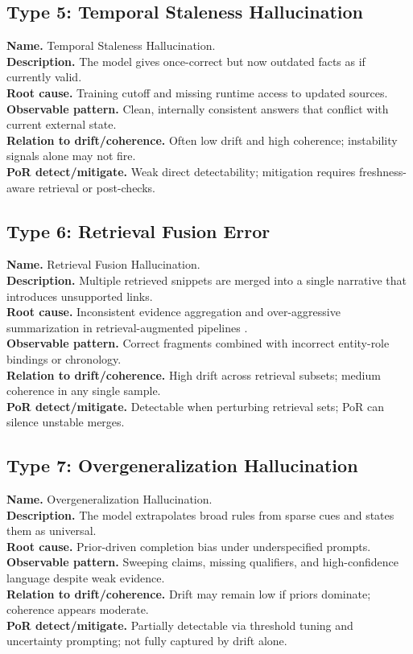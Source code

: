 \documentclass[11pt]{article}
\begin{document}
\subsection{Type 5: Temporal Staleness Hallucination}
\textbf{Name.} Temporal Staleness Hallucination.\\
\textbf{Description.} The model gives once-correct but now outdated facts as if currently valid.\\
\textbf{Root cause.} Training cutoff and missing runtime access to updated sources.\\
\textbf{Observable pattern.} Clean, internally consistent answers that conflict with current external state.\\
\textbf{Relation to drift/coherence.} Often low drift and high coherence; instability signals alone may not fire.\\
\textbf{PoR detect/mitigate.} Weak direct detectability; mitigation requires freshness-aware retrieval or post-checks.

\subsection{Type 6: Retrieval Fusion Error}
\textbf{Name.} Retrieval Fusion Hallucination.\\
\textbf{Description.} Multiple retrieved snippets are merged into a single narrative that introduces unsupported links.\\
\textbf{Root cause.} Inconsistent evidence aggregation and over-aggressive summarization in retrieval-augmented pipelines \cite{lewis2020rag}.\\
\textbf{Observable pattern.} Correct fragments combined with incorrect entity-role bindings or chronology.\\
\textbf{Relation to drift/coherence.} High drift across retrieval subsets; medium coherence in any single sample.\\
\textbf{PoR detect/mitigate.} Detectable when perturbing retrieval sets; PoR can silence unstable merges.

\subsection{Type 7: Overgeneralization Hallucination}
\textbf{Name.} Overgeneralization Hallucination.\\
\textbf{Description.} The model extrapolates broad rules from sparse cues and states them as universal.\\
\textbf{Root cause.} Prior-driven completion bias under underspecified prompts.\\
\textbf{Observable pattern.} Sweeping claims, missing qualifiers, and high-confidence language despite weak evidence.\\
\textbf{Relation to drift/coherence.} Drift may remain low if priors dominate; coherence appears moderate.\\
\textbf{PoR detect/mitigate.} Partially detectable via threshold tuning and uncertainty prompting; not fully captured by drift alone.
\end{document}
